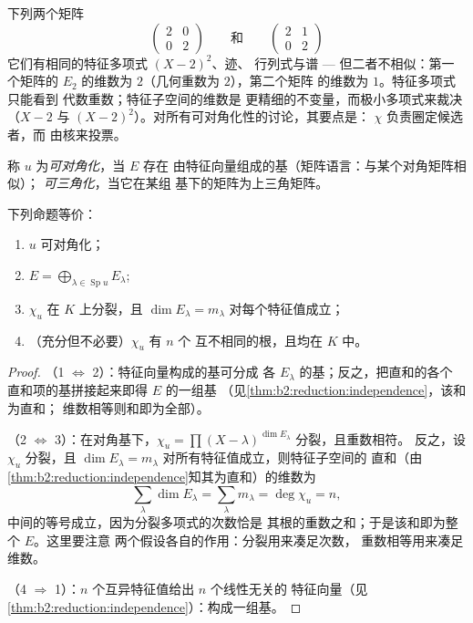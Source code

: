 \begin{example}\label{ex:b2:reduction:samechi}
下列两个矩阵
\[
\begin{pmatrix}2 & 0\\ 0 & 2\end{pmatrix}
\qquad\text{和}\qquad
\begin{pmatrix}2 & 1\\ 0 & 2\end{pmatrix}
\]
它们有相同的特征多项式 $(X - 2)^2$、迹、
行列式与谱 --- 但二者不相似：第一个矩阵的
$E_2$ 的维数为 $2$（几何重数为 $2$），第二个矩阵
的维数为 $1$。特征多项式只能看到
代数重数；特征子空间的维数是
更精细的不变量，而极小多项式来裁决（$X - 2$
与 $(X - 2)^2$）。对所有可对角化性的讨论，其要点是：
$\chi$ 负责圈定候选者，而
由核来投票。
\end{example}

\begin{definition}\label{def:b2:reduction:diag}
称 $u$ 为\emph{可对角化}，当 $E$ 存在
由特征向量组成的基（矩阵语言：与某个对角矩阵相似）；
\emph{可三角化}，当它在某组
基下的矩阵为上三角矩阵。
\end{definition}

\begin{theorem}[可对角化的判别准则]\label{thm:b2:reduction:diagcrit}
下列命题等价：
\begin{enumerate}
  \item $u$ 可对角化；
  \item $E = \bigoplus_{\lambda \in \operatorname{Sp} u} E_\lambda$;
  \item $\chi_u$ 在 $K$ 上分裂，且 $\dim E_\lambda = m_\lambda$
        对每个特征值成立；
  \item （充分但不必要）$\chi_u$ 有 $n$ 个
        互不相同的根，且均在 $K$ 中。
\end{enumerate}
\end{theorem}

\begin{proof}
（1 $\iff$ 2）：特征向量构成的基可分成
各 $E_\lambda$ 的基；反之，把直和的各个
直和项的基拼接起来即得 $E$ 的一组基
（见\cref{thm:b2:reduction:independence}，该和为直和；
维数相等则和即为全部）。

（2 $\iff$ 3）：在对角基下，$\chi_u = \prod (X -
\lambda)^{\dim E_\lambda}$ 分裂，且重数相符。
反之，设 $\chi_u$ 分裂，且 $\dim E_\lambda =
m_\lambda$ 对所有特征值成立，则特征子空间的
直和（由\cref{thm:b2:reduction:independence}知其为直和）的维数为
\[
\sum_{\lambda}\dim E_\lambda = \sum_{\lambda} m_\lambda =
\deg\chi_u = n ,
\]
中间的等号成立，因为分裂多项式的次数恰是
其根的重数之和；于是该和即为整个 $E$。这里要注意
两个假设各自的作用：分裂用来凑足次数，
重数相等用来凑足维数。

（4 $\Rightarrow$ 1）：$n$ 个互异特征值给出 $n$ 个线性无关的
特征向量（见\cref{thm:b2:reduction:independence}）：构成一组基。
\end{proof}

